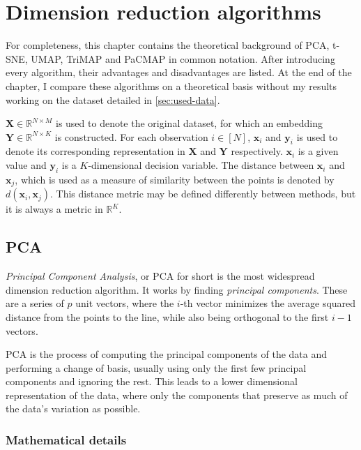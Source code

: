 \chapter{Dimension reduction algorithms}\label{ch:dimension-reduction-algorithms}

For completeness, this chapter contains the theoretical background of PCA, t-SNE, UMAP, TriMAP and PaCMAP in common notation. After introducing every algorithm, their advantages and disadvantages are listed. At the end of the chapter, I compare these algorithms on a theoretical basis without my results working on the dataset detailed in \ref{sec:used-data}.

$\mathbf{X} \in \mathbb{R}^{N\times M}$ is used to denote the original dataset, for which an embedding $\mathbf{Y} \in \mathbb{R}^{N\times K}$ is constructed. For each observation $i \in [N]$, $\mathbf{x}_i$ and $\mathbf{y}_i$ is used to denote its corresponding representation in $\mathbf{X}$ and $\mathbf{Y}$ respectively. $\mathbf{x}_i$ is a given value and $\mathbf{y}_i$ is a $K$-dimensional decision variable. The distance between $\mathbf{x}_i$ and $\mathbf{x}_j$, which is used as a measure of similarity between the points is denoted by $d(\mathbf{x}_i, \mathbf{x}_j)$. This distance metric may be defined differently between methods, but it is always a metric in $\mathbb{R}^{K}$.

\section{PCA}\label{sec:pca}

\textit{Principal Component Analysis}\cite{bib:pca}, or PCA for short is the most widespread dimension reduction algorithm. It works by finding \textit{principal components}. These are a series of $p$ unit vectors, where the $i$-th vector minimizes the average squared distance from the points to the line, while also being orthogonal to the first $i - 1$ vectors.

PCA is the process of computing the principal components of the data and performing a change of basis, usually using only the first few principal components and ignoring the rest. This leads to a lower dimensional representation of the data, where only the components that preserve as much of the data's variation as possible.

\subsection{Mathematical details}\label{subsec:mathematical-details}

